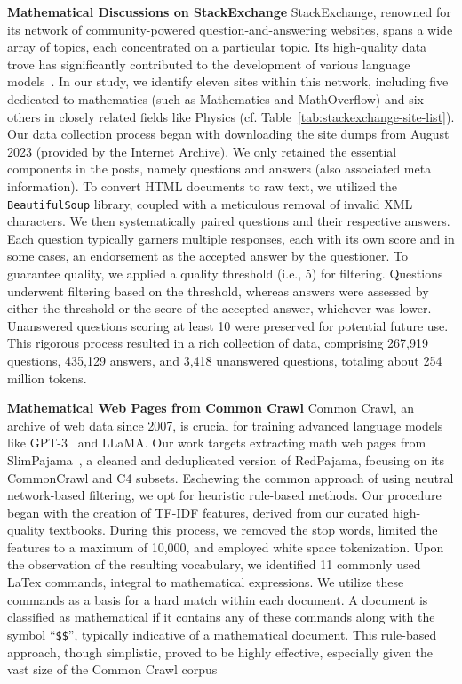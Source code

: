 \textbf{Mathematical Discussions on StackExchange} \quad StackExchange, renowned for its network of community-powered question-and-answering websites, spans a wide array of topics, each concentrated on a particular topic. Its high-quality data trove has significantly contributed to the development of various language models~\citep[][\emph{inter alia}]{DBLP:journals/corr/abs-2302-13971-llama,DBLP:journals/corr/abs-2305-11206-lima}. In our study, we identify eleven sites within this network, including five dedicated to mathematics (such as Mathematics and MathOverflow) and six others in closely related fields like Physics (cf. Table~\ref{tab:stackexchange-site-list}). Our data collection process began with downloading the site dumps from August 2023 (provided by the Internet Archive). We only retained the essential components in the posts, namely questions and answers (also associated meta information). To convert HTML documents to raw text, we utilized the \texttt{BeautifulSoup} library, coupled with a meticulous removal of invalid XML characters. We then systematically paired questions and their respective answers. Each question typically garners multiple responses, each with its own score and in some cases, an endorsement as the accepted answer by the questioner.  To guarantee quality, we applied a quality threshold (i.e., 5) for filtering. Questions underwent filtering based on the threshold, whereas answers were assessed by either the threshold or the score of the accepted answer, whichever was lower. Unanswered questions scoring at least 10 were preserved for potential future use. This rigorous process resulted in a rich collection of data, comprising 267,919 questions, 435,129 answers, and 3,418 unanswered questions, totaling about 254 million tokens.

\textbf{Mathematical Web Pages from Common Crawl} \quad Common Crawl, an archive of web data since 2007, is crucial for training advanced language models like GPT-3~\citep{DBLP:conf/nips/BrownMRSKDNSSAA20-gpt-3} and LLaMA. Our work targets extracting math web pages from SlimPajama~\citep{SlimPajama}, a cleaned and deduplicated version of RedPajama, focusing on its CommonCrawl and C4 subsets. Eschewing the common approach of using neutral network-based filtering, we opt for heuristic rule-based methods. Our procedure began with the creation of TF-IDF features, derived from our curated high-quality textbooks. During this process, we removed the stop words, limited the features to a maximum of 10,000, and employed white space tokenization. Upon the observation of the resulting vocabulary, we identified 11 commonly used LaTex commands, integral to mathematical expressions. We utilize these commands as a basis for a hard match within each document. A document is classified as mathematical if it contains any of these commands along with the symbol  ``\texttt{\$\$}'', typically indicative of a mathematical document. This rule-based approach, though simplistic, proved to be highly effective, especially given the vast size of the Common Crawl corpus

